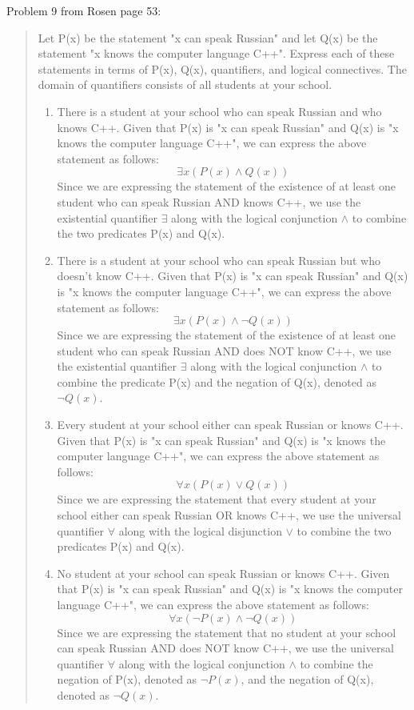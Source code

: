 \documentclass{article}
\begin{document}
Problem 9 from Rosen page 53:
\begin{quote}
    Let P(x) be the statement "x can speak Russian" and let Q(x) be the statement "x knows the computer language C++". Express each of these statements in terms of P(x), Q(x), quantifiers, and logical connectives. The domain of quantifiers consists of all students at your school.
    \begin{enumerate}[label=(\alph*)]
        \item There is a student at your school who can speak Russian and who knows C++.
        \smallbreak
        Given that P(x) is "x can speak Russian" and Q(x) is "x knows the computer language C++", we can express the above statement as follows:
        \[\exists x (P(x) \land Q(x)) \]
        Since we are expressing the statement of the existence of at least one student who can speak Russian AND knows C++, we use the existential quantifier $\exists$ along with the logical conjunction $\land$ to combine the two predicates P(x) and Q(x).
        \item There is a student at your school who can speak Russian but who doesn’t know C++.
        \smallbreak
        Given that P(x) is "x can speak Russian" and Q(x) is "x knows the computer language C++", we can express the above statement as follows:
        \[\exists x (P(x) \land \neg Q(x)) \]
        Since we are expressing the statement of the existence of at least one student who can speak Russian AND does NOT know C++, we use the existential quantifier $\exists$ along with the logical conjunction $\land$ to combine the predicate P(x) and the negation of Q(x), denoted as $\neg Q(x)$.
        \item Every student at your school either can speak Russian or knows C++.
        \smallbreak
        Given that P(x) is "x can speak Russian" and Q(x) is "x knows the computer language C++", we can express the above statement as follows:
        \[\forall x (P(x) \lor Q(x)) \]
        Since we are expressing the statement that every student at your school either can speak Russian OR knows C++, we use the universal quantifier $\forall$ along with the logical disjunction $\lor$ to combine the two predicates P(x) and Q(x).
        \item No student at your school can speak Russian or knows C++.
        \smallbreak
        Given that P(x) is "x can speak Russian" and Q(x) is "x knows the computer language C++", we can express the above statement as follows:
        \[\forall x (\neg P(x) \land \neg Q(x)) \]
        Since we are expressing the statement that no student at your school can speak Russian AND does NOT know C++, we use the universal quantifier $\forall$ along with the logical conjunction $\land$ to combine the negation of P(x), denoted as $\neg P(x)$, and the negation of Q(x), denoted as $\neg Q(x)$.
    \end{enumerate}
\end{quote}
\end{document}

